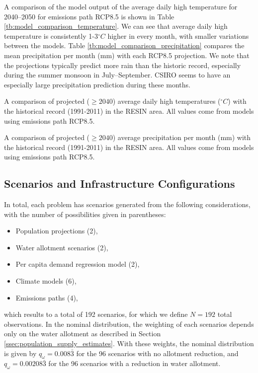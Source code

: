 \documentclass[opre,nonblindrev]{informs3} %
\begin{document}
A comparison of the model output of the average daily high temperature for 2040--2050 for emissions path RCP8.5 is shown in Table \ref{tb:model_comparison_temperature}.
We can see that average daily high temperature is consistently 1-3$^\circ C$ higher in every month, with smaller variations between the models.
Table \ref{tb:model_comparison_precipitation} compares the mean precipitation per month (mm) with each RCP8.5 projection.
We note that the projections typically predict more rain than the historic record, especially during the summer monsoon in July--September.
CSIRO seems to have an especially large precipitation prediction during these months.

\begin{table}
	\TABLE
	{
		A comparison of projected ($\geq 2040$) average daily high temperatures ($^\circ C$) with the historical record (1991-2011) in the RESIN area.
		All values come from models using emissions path RCP8.5.
		\label{tb:model_comparison_temperature}
	}
	{}
	{}
\end{table}

\begin{table}
	\TABLE
	{
		A comparison of projected ($\geq 2040$) average precipitation per month (mm) with the historical record (1991-2011) in the RESIN area.
		All values come from models using emissions path RCP8.5.
		\label{tb:model_comparison_precipitation}
	}
	{}
	{}
\end{table}


\subsection{Scenarios and Infrastructure Configurations}

In total, each problem has scenarios generated from the following considerations, with the number of possibilities given in parentheses:
\begin{itemize}
	\item Population projections (2),
	\item Water allotment scenarios (2),
	\item Per capita demand regression model (2),
	\item Climate models (6),
	\item Emissions paths (4),
\end{itemize}
which results to a total of 192 scenarios, for which we define $N= 192$ total observations.
In the nominal distribution, the weighting of each scenarios depends only on the water allotment as described in Section \ref{ssec:population_supply_estimates}.
With these weights, the nominal distribution is given by $q_\omega = 0.008\bar{3}$ for the 96 scenarios with no allotment reduction, and $q_\omega = 0.00208\bar{3}$ for the 96 scenarios with a reduction in water allotment.
\end{document}

